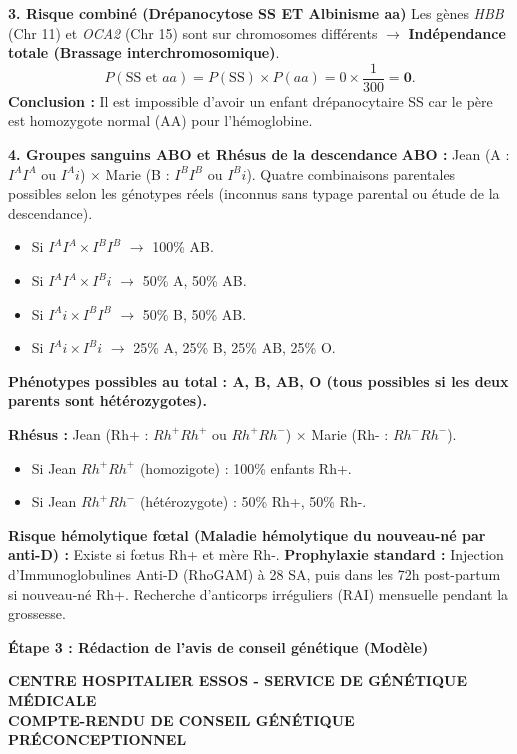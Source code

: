 \documentclass[11pt]{article}
\begin{document}
\begin{exoresolu}
\medskip
\noindent \textbf{3. Risque combiné (Drépanocytose SS ET Albinisme aa)}
Les gènes \emph{HBB} (Chr 11) et \emph{OCA2} (Chr 15) sont sur chromosomes différents $\rightarrow$ \textbf{Indépendance totale (Brassage interchromosomique)}.
\[
P(\text{SS et } aa) = P(\text{SS}) \times P(aa) = 0 \times \frac{1}{300} = \mathbf{0}.
\]
\textbf{Conclusion :} Il est impossible d'avoir un enfant drépanocytaire SS car le père est homozygote normal (AA) pour l'hémoglobine.

\medskip
\noindent \textbf{4. Groupes sanguins ABO et Rhésus de la descendance}
\textbf{ABO :} Jean (A : $I^A I^A$ ou $I^A i$) $\times$ Marie (B : $I^B I^B$ ou $I^B i$).
Quatre combinaisons parentales possibles selon les génotypes réels (inconnus sans typage parental ou étude de la descendance).
\begin{itemize}
    \item Si $I^A I^A \times I^B I^B$ $\rightarrow$ 100\% AB.
    \item Si $I^A I^A \times I^B i$ $\rightarrow$ 50\% A, 50\% AB.
    \item Si $I^A i \times I^B I^B$ $\rightarrow$ 50\% B, 50\% AB.
    \item Si $I^A i \times I^B i$ $\rightarrow$ 25\% A, 25\% B, 25\% AB, 25\% O.
\end{itemize}
\textbf{Phénotypes possibles au total : A, B, AB, O (tous possibles si les deux parents sont hétérozygotes).}

\textbf{Rhésus :} Jean (Rh+ : $Rh^+ Rh^+$ ou $Rh^+ Rh^-$) $\times$ Marie (Rh- : $Rh^- Rh^-$).
\begin{itemize}
    \item Si Jean $Rh^+ Rh^+$ (homozigote) : 100\% enfants Rh+.
    \item Si Jean $Rh^+ Rh^-$ (hétérozygote) : 50\% Rh+, 50\% Rh-.
\end{itemize}
\textbf{Risque hémolytique fœtal (Maladie hémolytique du nouveau-né par anti-D) :} Existe si fœtus Rh+ et mère Rh-. \textbf{Prophylaxie standard :} Injection d'Immunoglobulines Anti-D (RhoGAM) à 28 SA, puis dans les 72h post-partum si nouveau-né Rh+. Recherche d'anticorps irréguliers (RAI) mensuelle pendant la grossesse.

\medskip
\noindent \textbf{Étape 3 : Rédaction de l'avis de conseil génétique (Modèle)}

\medskip
\noindent \textbf{CENTRE HOSPITALIER ESSOS - SERVICE DE GÉNÉTIQUE MÉDICALE} \\
\textbf{COMPTE-RENDU DE CONSEIL GÉNÉTIQUE PRÉCONCEPTIONNEL}


\end{exoresolu}
\end{document}
